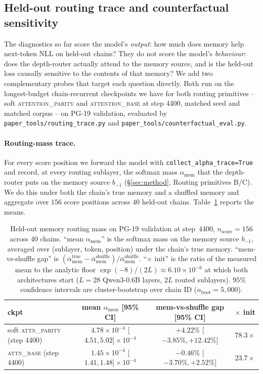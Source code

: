 \documentclass{article}
\begin{document}
\subsection{Held-out routing trace and counterfactual sensitivity}
\label{sec:routing_trace}

The diagnostics so far score the model's \emph{output}: how much does
memory help next-token NLL on held-out chains? They do not score the
model's \emph{behaviour}: does the depth-router actually attend to the
memory source, and is the held-out loss causally sensitive to the
contents of that memory? We add two complementary probes that target
each question directly. Both run on the longest-budget chain-recurrent
checkpoints we have for both routing primitives -- soft
\textsc{attention\_parity} and \textsc{attention\_base} at step 4400,
matched seed and matched corpus -- on PG-19 validation, evaluated by
\texttt{paper\_tools/routing\_trace.py} and
\texttt{paper\_tools/counterfactual\_eval.py}.

\paragraph{Routing-mass trace.}
For every score position we forward the model with
\texttt{collect\_alpha\_trace=True} and record, at every routing
sublayer, the softmax mass $\alpha_{\text{mem}}$ that the depth-router
puts on the memory source $b_{-1}$ (\S\ref{sec:method}, Routing
primitives B/C). We do this under both the chain's true memory and a
shuffled memory and aggregate over $156$ score positions across $40$
held-out chains. Table~\ref{tab:routing_mass} reports the means.

\begin{table}[t]
\centering
\caption{Held-out memory routing mass on PG-19 validation at step~4400,
$n_{\text{score}}=156$ across $40$ chains.  ``mean $\alpha_{\text{mem}}$''
is the softmax mass on the memory source $b_{-1}$, averaged over
(sublayer, token, position) under the chain's true memory.
``mem-vs-shuffle gap'' is
$(\bar{\alpha}_{\text{mem}}^{\text{true}} -
  \bar{\alpha}_{\text{mem}}^{\text{shuffle}})\big/
  \bar{\alpha}_{\text{mem}}^{\text{shuffle}}$.
``$\times$ init'' is the ratio of the measured mean to the analytic
floor $\exp(-8)/(2L) \approx 6.10{\times}10^{-6}$ at which both
architectures start ($L{=}28$ Qwen3-0.6B layers, $2L$ routed sublayers).
$95\%$ confidence intervals are cluster-bootstrap over chain ID
($n_{\text{boot}}{=}5{,}000$).}
\label{tab:routing_mass}
\small
\begin{tabular}{lccc}
\toprule
ckpt & mean $\alpha_{\text{mem}}$ {[}95\% CI{]} & mem-vs-shuffle gap {[}95\% CI{]} & $\times$ init \\
\midrule
soft \textsc{attn\_parity}  (step 4400) & $4.78{\times}10^{-4}$ {[}$4.51, 5.02{]}{\times}10^{-4}$ & $+4.22\%$ {[}$-3.85\%, +12.42\%${]} & $78.3\times$ \\
\textsc{attn\_base}         (step 4400) & $1.45{\times}10^{-4}$ {[}$1.41, 1.48{]}{\times}10^{-4}$ & $-0.46\%$ {[}$-3.70\%, +2.52\%${]} & $23.7\times$ \\
\bottomrule
\end{tabular}
\end{table}
\end{document}
